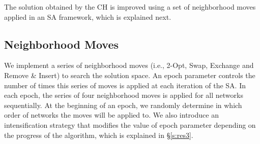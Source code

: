 \documentclass[11pt]{article}
\begin{document}

The solution obtained by the CH is improved using a set of neighborhood moves applied in an SA framework, which is explained next.





\subsection{Neighborhood Moves}  \label{s:res2}

We implement a series of neighborhood moves (i.e., 2-Opt, Swap, Exchange and Remove \& Insert) to search the solution space. An epoch parameter controls the number of times this series of moves is applied at each iteration of the SA. In each epoch, the series of four neighborhood moves is applied for all networks sequentially. At the beginning of an epoch, we randomly determine in which order of networks the moves will be applied to. We also introduce an intensification strategy that modifies the value of epoch parameter depending on the progress of the algorithm, which is explained in \S \ref{s:res3}. %
\end{document}
